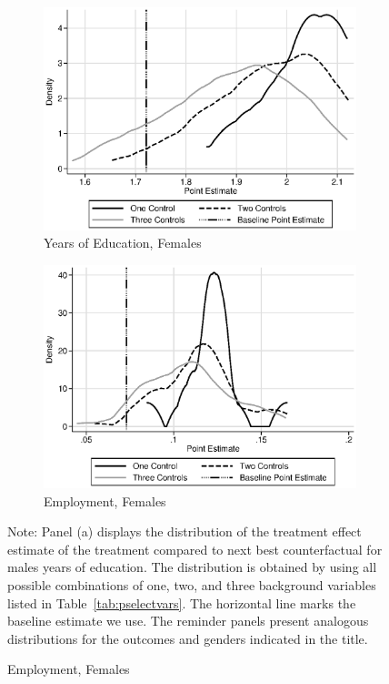 \begin{figure}
\begin{subfigure}[h]{0.4\textwidth}
\end{subfigure}
\begin{subfigure}[h]{0.4\textwidth}
		\centering
		\caption{Years of Education, Females}
		\includegraphics[width=\textwidth]{output/sencontrols_female_years_30y_itt_wctrl.eps}
\end{subfigure}%
\begin{subfigure}[h]{0.4\textwidth}
	\centering
	\caption{Employment, Females}
		\includegraphics[width=\textwidth]{output/sencontrols_female_si30y_works_itt_wctrl.eps}
\end{subfigure}
\footnotesize \justify
Note: Panel (a) displays the distribution of the treatment effect estimate of the treatment compared to next best counterfactual for males years of education. The distribution is obtained by using all possible combinations of one, two, and three background variables listed in Table~\ref{tab:pselectvars}. The horizontal line marks the baseline estimate we use. The reminder panels present analogous distributions for the outcomes and genders indicated in the title.\\
\end{figure}

